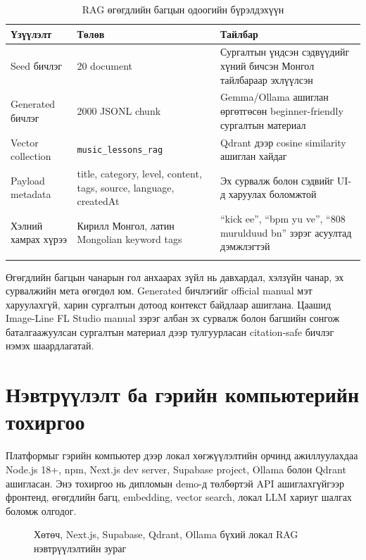 \begin{longtable}{|p{}|p{}|p{}|}
  \hline
  \textbf{Үзүүлэлт} & \textbf{Төлөв} & \textbf{Тайлбар} \\ \hline
  Seed бичлэг & 20 document & Сургалтын үндсэн сэдвүүдийг хүний бичсэн Монгол тайлбараар эхлүүлсэн \\ \hline
  Generated бичлэг & 2000 JSONL chunk & Gemma/Ollama ашиглан өргөтгөсөн beginner-friendly сургалтын материал \\ \hline
  Vector collection & \texttt{music\_lessons\_rag} & Qdrant дээр cosine similarity ашиглан хайдаг \\ \hline
  Payload metadata & title, category, level, content, tags, source, language, createdAt & Эх сурвалж болон сэдвийг UI-д харуулах боломжтой \\ \hline
  Хэлний хамрах хүрээ & Кирилл Монгол, латин Mongolian keyword tags & ``kick ee'', ``bpm yu ve'', ``808 murulduud bn'' зэрэг асуултад дэмжлэгтэй \\ \hline
  \caption{RAG өгөгдлийн багцын одоогийн бүрэлдэхүүн}
  \label{tab:ch3-dataset}
\end{longtable}

Өгөгдлийн багцын чанарын гол анхаарах зүйл нь давхардал, хэлзүйн чанар, эх сурвалжийн мета өгөгдөл юм. Generated бичлэгийг official manual мэт харуулахгүй, харин сургалтын дотоод контекст байдлаар ашиглана. Цаашид Image-Line FL Studio manual зэрэг албан эх сурвалж \cite{flstudio_workflow} болон багшийн сонгож баталгаажуулсан сургалтын материал дээр тулгуурласан citation-safe бичлэг нэмэх шаардлагатай.

\section{Нэвтрүүлэлт ба гэрийн компьютерийн тохиргоо}
Платформыг гэрийн компьютер дээр локал хөгжүүлэлтийн орчинд ажиллуулахдаа Node.js 18+, npm, Next.js dev server, Supabase project, Ollama болон Qdrant ашигласан. Энэ тохиргоо нь дипломын demo-д төлбөртэй API ашиглахгүйгээр фронтенд, өгөгдлийн багц, embedding, vector search, локал LLM хариуг шалгах боломж олгодог.

\begin{figure}[H]
  \centering
  \resizebox{\textwidth}{!}{}
  \caption[Нэвтрүүлэлтийн архитектур]{Хөтөч, Next.js, Supabase, Qdrant, Ollama бүхий локал RAG нэвтрүүлэлтийн зураг}
  \label{fig:ch3-deployment}
\end{figure}

